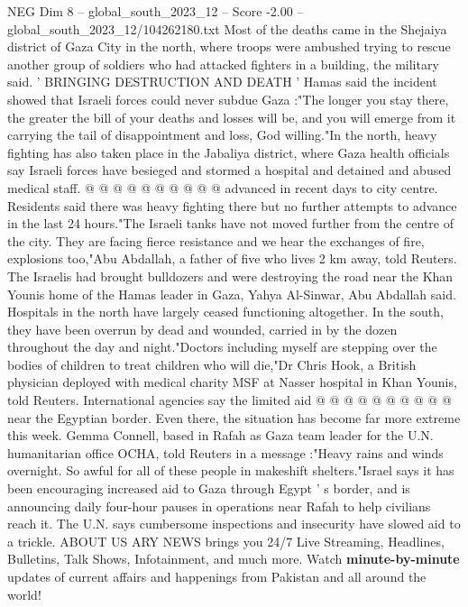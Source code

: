 \begin{textsample}{NEG Dim 8 – global\_south\_2023\_12 – Score -2.00 – global\_south\_2023\_12/104262180.txt}
Most of the deaths came in the Shejaiya district of Gaza City in the north, where troops were ambushed trying to rescue another group of soldiers who had attacked fighters in a building, the military said. ' BRINGING DESTRUCTION AND DEATH ' Hamas said the incident showed that Israeli forces could never subdue Gaza :"The longer you stay there, the greater the bill of your deaths and losses will be, and you will emerge from it carrying the tail of disappointment and loss, God willing."In the north, heavy fighting has also taken place in the Jabaliya district, where Gaza health officials say Israeli forces have besieged and stormed a hospital and detained and abused medical staff. @ @ @ @ @ @ @ @ @ @ advanced in recent days to city centre.
Residents said there was heavy fighting there but no further attempts to advance in the last 24 hours."The Israeli tanks have not moved further from the centre of the city.
They are facing fierce resistance and we hear the exchanges of fire, explosions too,"Abu Abdallah, a father of five who lives 2 km away, told Reuters.
The Israelis had brought bulldozers and were destroying the road near the Khan Younis home of the Hamas leader in Gaza, Yahya Al-Sinwar, Abu Abdallah said.
Hospitals in the north have largely ceased functioning altogether.
In the south, they have been overrun by dead and wounded, carried in by the dozen throughout the day and night."Doctors including myself are stepping over the bodies of children to treat children who will die,"Dr Chris Hook, a British physician deployed with medical charity MSF at Nasser hospital in Khan Younis, told Reuters.
International agencies say the limited aid @ @ @ @ @ @ @ @ @ @ near the Egyptian border.
Even there, the situation has become far more extreme this week.
Gemma Connell, based in Rafah as Gaza team leader for the U.N. humanitarian office OCHA, told Reuters in a message :"Heavy rains and winds overnight.
So awful for all of these people in makeshift shelters."Israel says it has been encouraging increased aid to Gaza through Egypt ' s border, and is announcing daily four-hour pauses in operations near Rafah to help civilians reach it.
The U.N. says cumbersome inspections and insecurity have slowed aid to a trickle.
ABOUT US ARY NEWS brings you 24/7 Live Streaming, Headlines, Bulletins, Talk Shows, Infotainment, and much more.
Watch \textbf{minute-by-minute} updates of current affairs and happenings from Pakistan and all around the world!

\end{textsample}
